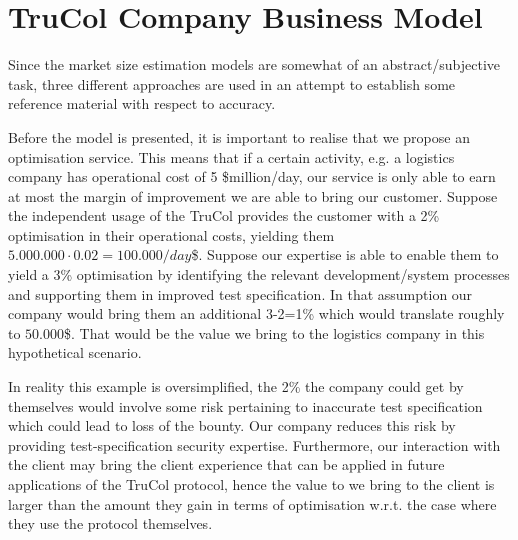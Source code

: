 \section{TruCol Company Business Model}\label{sec:trucol_company_business_model}
Since the market size estimation models are somewhat of an abstract/subjective task, three different approaches are used in an attempt to establish some reference material with respect to accuracy.


Before the model is presented, it is important to realise that we propose an optimisation service. This means that if a certain activity, e.g. a logistics company has operational cost of 5 \$million/day, our service is only able to earn at most the margin of improvement we are able to bring our customer. Suppose the independent usage of the TruCol provides the customer with a 2\% optimisation in their operational costs, yielding them $5.000.000\cdot 0.02=100.000/day$\$. Suppose our expertise is able to enable them to yield a 3\% optimisation by identifying the relevant development/system processes and supporting them in improved test specification. In that assumption our company would bring them an additional 3-2=1\% which would translate roughly to $50.000$\$. That would be the value we bring to the logistics company in this hypothetical scenario.

In reality this example is oversimplified, the 2\% the company could get by themselves would involve some risk pertaining to inaccurate test specification which could lead to loss of the bounty. Our company reduces this risk by providing test-specification security expertise. Furthermore, our interaction with the client may bring the client experience that can be applied in future applications of the TruCol protocol, hence the value to we bring to the client is larger than the amount they gain in terms of optimisation w.r.t. the case where they use the protocol themselves.